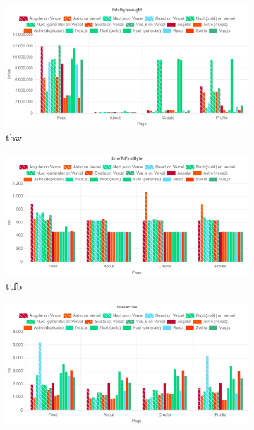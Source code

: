 \documentclass[a4paper, 12pt]{article}
\begin{document}
\begin{figure}[!h]
  \centering
  \begin{subfigure}{0.49\linewidth}
    \begin{center}
      \includegraphics[width=\linewidth, keepaspectratio]{img/lighthouse-results/TBW.png}
    \end{center}
    \caption{\acrfull{tbw}}\label{subfig:LH:totalbyteweight}
  \end{subfigure}
  \begin{subfigure}{0.49\linewidth}
    \begin{center}
      \includegraphics[width=\linewidth, keepaspectratio]{img/lighthouse-results/TTFB.png}
    \end{center}
    \caption{\acrfull{ttfb}}\label{subfig:LH:timeToFirstByte}
  \end{subfigure}
  \begin{subfigure}{0.49\linewidth}
    \begin{center}
      \includegraphics[width=\linewidth, keepaspectratio]{img/lighthouse-results/TTI.png}

\end{center}
\end{subfigure}
\end{figure}
\end{document}

